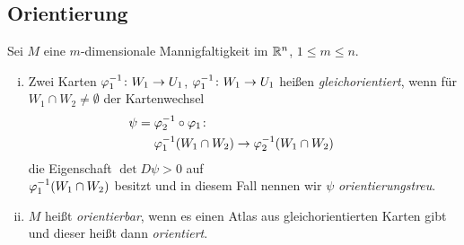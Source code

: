 \documentclass[skript.tex]{subfiles}
\begin{document}
	\begin{center}
	\end{center}
	\subsection*{Orientierung\footnotemark}
	\begin{defin}
		Sei $M$ eine $m$-dimensionale Mannigfaltigkeit im ${\mathbb{R}^n}$, $1 \leq m \leq n$.\\
		\begin{minipage}{.5\textwidth}
			\begin{enumerate}[(i)]
				\item Zwei Karten $\varphi_1^{-1} \colon W_1 \to U_1$, $\varphi_1^{-1} \colon W_1 \to U_1$ heißen \emph{gleichorientiert}, wenn für $W_1 \cap W_2 \neq \emptyset$ der Kartenwechsel
				\begin{align*}
					\hspace{-2em}
					\psi = \vphi_2^{-1}&\circ\vphi_1 \colon\\ \vphi_1^{-1}&(W_1 \cap W_2) \to \vphi_2^{-1}(W_1 \cap W_2)
				\end{align*}
				die Eigenschaft $\det D\psi > 0$ auf\\$\varphi_1^{-1}(W_1 \cap W_2)$ besitzt und in diesem Fall nennen wir $\psi$ \emph{orientierungstreu}.
				\item $M$ heißt \emph{orientierbar}, wenn es einen Atlas aus gleichorientierten Karten gibt und dieser heißt dann \emph{orientiert}.
			\end{enumerate}
		\end{minipage}
		\hfill
	\end{defin}
\end{document}
